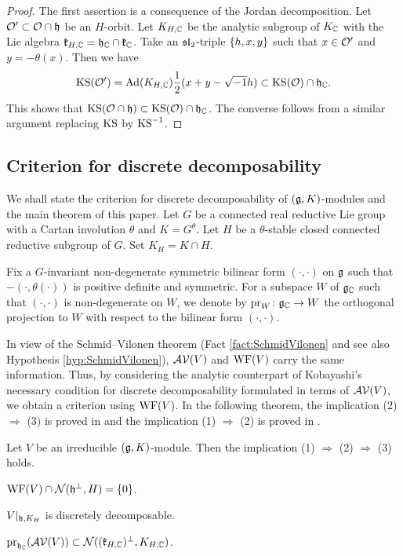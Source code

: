 \begin{proof}
	The first assertion is a consequence of the Jordan decomposition.
	Let $\mathcal{O}'\subset \mathcal{O} \cap \mathfrak{h}$ be an $H$-orbit.
	Let $K_{H,\mathbb{C}}$ be the analytic subgroup of $K_{\mathbb{C}}$ with the Lie algebra $\mathfrak{k}_{H,\mathbb{C}} = \mathfrak{h}_{\mathbb{C}} \cap \mathfrak{k}_{\mathbb{C}}$.
	Take an $\mathfrak{sl}_2$-triple $\left\{h, x, y \right\}$ such that $x \in \mathcal{O}'$ and $y = -\theta(x)$.
	Then we have
	\begin{align*}
		\mathrm{KS}(\mathcal{O}') = \mathrm{Ad}(K_{H,\mathbb{C}})\frac{1}{2}(x + y - \sqrt{-1}h) \subset \mathrm{KS}(\mathcal{O}) \cap \mathfrak{h}_{\mathbb{C}}.
	\end{align*}
	This shows that $\mathrm{KS}(\mathcal{O}\cap \mathfrak{h}) \subset \mathrm{KS}(\mathcal{O}) \cap \mathfrak{h}_{\mathbb{C}}$.
	The converse follows from a similar argument replacing $\mathrm{KS}$ by $\mathrm{KS}^{-1}$.
\end{proof}

\subsection{Criterion for discrete decomposability}

We shall state the criterion for discrete decomposability of $(\mathfrak{g}, K)$-modules and the main theorem of this paper.
Let $G$ be a connected real reductive Lie group with a Cartan involution $\theta$ and $K = G^\theta$.
Let $H$ be a $\theta$-stable closed connected reductive subgroup of $G$.
Set $K_H = K \cap H$.

Fix a $G$-invariant non-degenerate symmetric bilinear form $(\cdot, \cdot)$ on $\mathfrak{g}$ such that $-(\cdot, \theta(\cdot))$ is positive definite and symmetric.
For a subspace $W$ of $\mathfrak{g}_{\mathbb{C}}$ such that $(\cdot, \cdot)$ is non-degenerate on $W$, we denote by $\mathrm{pr}_{W}\colon \mathfrak{g}_{\mathbb{C}} \to W$ the orthogonal projection to $W$ with respect to the bilinear form $(\cdot, \cdot)$.

In view of the Schmid--Vilonen theorem (Fact \ref{fact:SchmidVilonen} and see also Hypothesis \ref{hyp:SchmidVilonen}), $\mathcal{AV}(V)$ and $\mathrm{WF}(V)$ carry the same information.
Thus, by considering the analytic counterpart of Kobayashi's necessary condition for discrete decomposability formulated in terms of $\mathcal{AV}(V)$, we obtain a criterion using $\mathrm{WF}(V)$.
In the following theorem, the implication (2) $\Rightarrow$ (3) is proved in \cite[Corollary 3.4]{Ko98_discrete_decomposable_3} and the implication (1) $\Rightarrow$ (2) is proved in \cite[Theorem 17]{Ki24}.

\begin{fact} \label{fact:Implication}
	Let $V$ be an irreducible $(\mathfrak{g}, K)$-module.
	Then the implication (1) $\Rightarrow$ (2) $\Rightarrow$ (3) holds.
	\begin{enumparen}
		\item $\mathrm{WF}(V)\cap \mathcal{N}(\mathfrak{h}^\perp, H) = \left\{0 \right\}$.
		\item $V|_{\mathfrak{h}, K_H}$ is discretely decomposable.
		\item $\mathrm{pr}_{\mathfrak{h}_{\mathbb{C}}}(\mathcal{AV}(V)) \subset \mathcal{N}((\mathfrak{k}_{H, \mathbb{C}})^\perp, K_{H, \mathbb{C}})$.
	\end{enumparen}
\end{fact}


